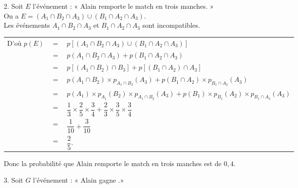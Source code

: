 \begin{itemize}
\vspace*{.3cm}

\item[2.] Soit $E$ l'événement : « Alain remporte le match en trois manches. » \\

On a $E = \left(A_1 \cap B_2 \cap A_3\right) \cup \left(B_1 \cap A_2 \cap A_3\right)$. \\

Les événements $A_1 \cap B_2 \cap A_3$ et $B_1 \cap A_2 \cap A_3$ sont incompatibles. \\

\begin{tabular}{lll}
\hspace{-.3cm} D'où $p\left(E\right)$ & $=$ & $p\left[\left(A_1 \cap B_2 \cap A_3\right) \cup \left(B_1 \cap A_2 \cap A_3\right)\right]$ \\
& $=$ & $p\left(A_1 \cap B_2 \cap A_3\right) + p\left(B_1 \cap A_2 \cap A_3\right)$ \\
& $=$ & $p\left[\left(A_1 \cap B_2\right) \cap B_3\right] + p\left[\left(B_1 \cap A_2\right) \cap A_3\right]$ \\
& $=$ & $p\left(A_1 \cap B_2\right) \times p_{A_1 \cap B_2}\left(A_3\right) + p\left(B_1 \cap A_2\right) \times p_{B_1 \cap A_2}\left(A_3\right)$ \\
& $=$ & $p\left(A_1\right) \times p_{A_1}\left(B_2\right) \times p_{A_1 \cap B_2}\left(A_3\right) + p\left(B_1\right) \times p_{B_1}\left(A_2\right) \times p_{B_1 \cap A_2}\left(A_3\right)$ \vspace*{.3cm} \\
& $=$ & $\dfrac{1}{3} \times \dfrac{2}{5} \times \dfrac{3}{4} + \dfrac{2}{3} \times \dfrac{3}{5} \times \dfrac{3}{4}$ \vspace*{.3cm} \\
& $=$ & $\dfrac{1}{10} + \dfrac{3}{10}$ \vspace*{.3cm} \\
& $=$ & $\dfrac{2}{5}$. \\
\end{tabular}

\vspace*{.3cm}

Donc la probabilité que Alain remporte le match en trois manches est de $0,4$. \\

\item[3.] Soit $G$ l'événement : « Alain gagne .» \\


\end{itemize}
